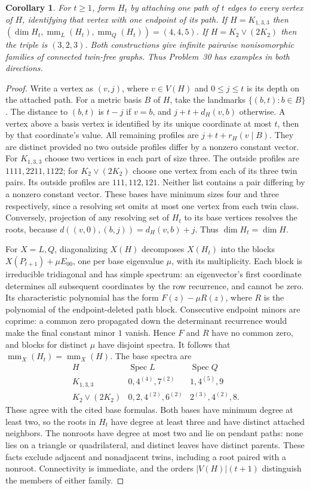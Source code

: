 \documentclass[11pt]{article}
\newtheorem{corollary}[theorem]{Corollary}
\newcommand{\mm}{\operatorname{mm}}
\begin{document}
\begin{corollary}\label{cor:rooted}
For $t\geq1$, form $H_t$ by attaching one path of $t$ edges to every
vertex of $H$, identifying that vertex with one endpoint of its path.
If $H=K_{1,3,3}$ then
$(\dim H_t,\mm_L(H_t),\mm_Q(H_t))=(4,4,5)$.
If $H=K_2\vee(2K_2)$ then the triple is $(3,2,3)$.
Both constructions give infinite pairwise nonisomorphic families of
connected twin-free graphs. Thus Problem~30 has examples in both directions.
\end{corollary}
\begin{proof}
Write a vertex as $(v,j)$, where $v\in V(H)$ and $0\leq j\leq t$ is
its depth on the attached path. For a metric basis $B$ of $H$, take
the landmarks $\{(b,t):b\in B\}$. The distance to $(b,t)$ is $t-j$ if
$v=b$, and $j+t+d_H(v,b)$ otherwise. A vertex above a basis vertex
is identified by its unique coordinate at most $t$, then by that
coordinate's value. All remaining profiles are
$j+t+r_H(v\mid B)$. They are distinct provided no two outside
profiles differ by a nonzero constant vector.
For $K_{1,3,3}$ choose two vertices in each part of size three.
The outside profiles are $1111,2211,1122$; for $K_2\vee(2K_2)$ choose
one vertex from each of its three twin pairs. Its outside profiles
are $111,112,121$. Neither list contains a pair differing by a
nonzero constant vector. These bases have minimum sizes four and
three respectively, since a resolving set omits at most one vertex
from each twin class. Conversely, projection of any resolving set
of $H_t$ to its base vertices resolves the roots, because
$d((v,0),(b,j))=d_H(v,b)+j$. Thus $\dim H_t=\dim H$.

For $X=L,Q$, diagonalizing $X(H)$ decomposes $X(H_t)$ into the
blocks $X(P_{t+1})+\mu E_{00}$, one per base eigenvalue $\mu$,
with its multiplicity. Each block is irreducible tridiagonal and
has simple spectrum: an eigenvector's first coordinate determines
all subsequent coordinates by the row recurrence, and cannot be zero.
Its characteristic polynomial has the form $F(z)-\mu R(z)$,
where $R$ is the polynomial of the endpoint-deleted path block.
Consecutive endpoint minors are coprime: a common zero propagated
down the determinant recurrence would make the final constant
minor $1$ vanish. Hence $F$ and $R$ have no common zero, and blocks
for distinct $\mu$ have disjoint spectra. It follows that
$\mm_X(H_t)=\mm_X(H)$.
The base spectra are
\[
\begin{array}{c|cc}
H&\operatorname{Spec}L&\operatorname{Spec}Q\\\hline
K_{1,3,3}&0,4^{(4)},7^{(2)}&1,4^{(5)},9\\
K_2\vee(2K_2)&0,2,4^{(2)},6^{(2)}&2^{(3)},4^{(2)},8.
\end{array}
\]
These agree with the cited base formulas.
Both bases have minimum degree at least two, so the roots in $H_t$
have degree at least three and have distinct attached neighbors.
The nonroots have degree at most two and lie on pendant paths:
none lies on a triangle or quadrilateral, and distinct leaves have
distinct parents. These facts exclude adjacent and nonadjacent twins,
including a root paired with a nonroot. Connectivity is immediate,
and the orders $|V(H)|(t+1)$ distinguish the members of either family.
\end{proof}
\end{document}
